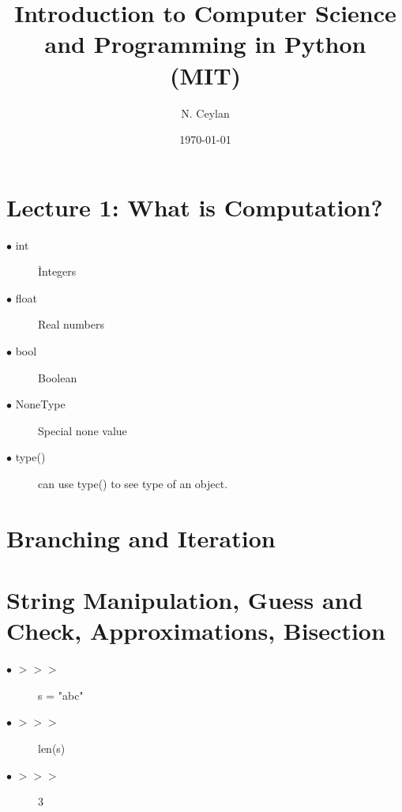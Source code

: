 \documentclass[letterpaper,12pt]{article}
\begin{document}
\title{Introduction to Computer Science and Programming in Python (MIT)}
\author{N. Ceylan}
\date{\today}
\maketitle



\section{Lecture 1: What is Computation?}




\begin{description}

	\item[$\bullet$ int] İntegers
	\item[$\bullet$ float] Real numbers
		\item[$\bullet$ bool] Boolean
	\item[$\bullet$ NoneType] Special none value
	\item[$\bullet$ type()] can use type() to see type of an object.
	
	
\end{description}

\section{ Branching and Iteration}




\section{String Manipulation, Guess and Check, Approximations, Bisection}


\begin{description}
	
	\item[$\bullet$ $>>>$] s = "abc"
	\item[$\bullet$ $>>>$] len(s)
    \item[$\bullet$ $>>>$] 3


	
	
\end{description}
\end{document}
